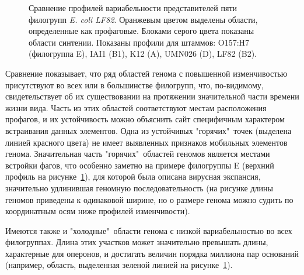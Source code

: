 \begin{figure}[!ht] 
    \center
    \setlength{\fboxsep}{10pt}%
    \setlength{\fboxrule}{0pt}%
    \caption{Сравнение профилей вариабельности представителей пяти филогрупп \textit{E. coli LF82}. Оранжевым цветом выделены области, определенные как профаговые. Блоками серого цвета показаны области синтении. Показаны профили для штаммов: O157:H7 (филогруппа E), IAI1 (B1), K12 (A), UMN026 (D), LF82 (B2). }
    \label{img:phylogroups_complex} 
  \end{figure}
  
  

Сравнение показывает, что ряд областей генома с повышенной изменчивостью присутствуют во всех или в большинстве филогрупп, что, по-видимому, свидетельствует об их существовании на протяжении значительной части времени жизни вида. Часть из этих областей соответствуют местам расположения профагов, и их устойчивость можно объяснить сайт специфичным характером встраивания данных элементов. Одна из устойчивых "горячих"\ точек (выделена линией красного цвета) не имеет выявленных признаков мобильных элементов генома. Значительная часть "горячих"\ областей геномов является местами встройки фагов, что особенно заметно на примере филогруппы E (верхний профиль на рисунке~\ref{img:phylogroups_complex}), для которой была описана вирусная экспансия, значительно удлинившая геномную последовательность (на рисунке длины геномов приведены к одинаковой ширине, но о размере генома можно судить по координатным осям ниже профилей изменчивости).

Имеются также и "холодные"\ области генома с низкой вариабельностью во всех филогруппах. Длина этих участков может значительно превышать длины, характерные для оперонов, и достигать величин порядка миллиона пар оснований (например, область, выделенная зеленой линией на рисунке~\ref{img:phylogroups_complex}).

